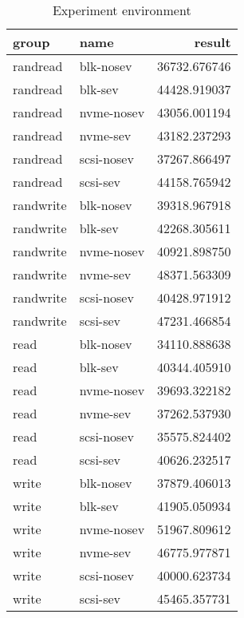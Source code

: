 \documentclass[twocolumn]{article}
\begin{document}
\begin{table*}
    \centering
    \label{tab:al-results}
    \begin{tabular}{|l|l|r|}
    \hline
        group &       name &       result \\
    \hline
    randread &  blk-nosev & 36732.676746 \\
    randread &    blk-sev & 44428.919037 \\
    randread & nvme-nosev & 43056.001194 \\
    randread &   nvme-sev & 43182.237293 \\
    randread & scsi-nosev & 37267.866497 \\
    randread &   scsi-sev & 44158.765942 \\
    randwrite &  blk-nosev & 39318.967918 \\
    randwrite &    blk-sev & 42268.305611 \\
    randwrite & nvme-nosev & 40921.898750 \\
    randwrite &   nvme-sev & 48371.563309 \\
    randwrite & scsi-nosev & 40428.971912 \\
    randwrite &   scsi-sev & 47231.466854 \\
        read &  blk-nosev & 34110.888638 \\
        read &    blk-sev & 40344.405910 \\
        read & nvme-nosev & 39693.322182 \\
        read &   nvme-sev & 37262.537930 \\
        read & scsi-nosev & 35575.824402 \\
        read &   scsi-sev & 40626.232517 \\
        write &  blk-nosev & 37879.406013 \\
        write &    blk-sev & 41905.050934 \\
        write & nvme-nosev & 51967.809612 \\
        write &   nvme-sev & 46775.977871 \\
        write & scsi-nosev & 40000.623734 \\
        write &   scsi-sev & 45465.357731 \\    
    \hline
    \end{tabular}
    \caption{Experiment environment}
\end{table*}
\end{document}
